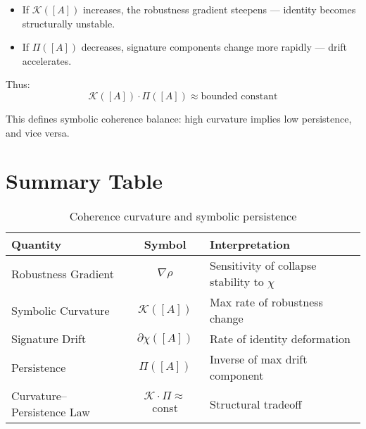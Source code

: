 \begin{itemize}
    \item If $\mathcal{K}([A])$ increases, the robustness gradient steepens — identity becomes structurally unstable.
    \item If $\Pi([A])$ decreases, signature components change more rapidly — drift accelerates.
\end{itemize}

Thus:
\begin{equation} \label{eq:curvature-inverse-persistence}
\mathcal{K}([A]) \cdot \Pi([A]) \approx \text{bounded constant}
\end{equation}

This defines symbolic coherence balance: high curvature implies low persistence, and vice versa.

\section{Summary Table}

\begin{table}[h!]
\centering
\begin{tabular}{|l|c|l|}
\hline
\textbf{Quantity} & \textbf{Symbol} & \textbf{Interpretation} \\
\hline
Robustness Gradient & $\nabla \rho$ & Sensitivity of collapse stability to $\chi$ \\
Symbolic Curvature & $\mathcal{K}([A])$ & Max rate of robustness change \\
Signature Drift & $\partial\chi([A])$ & Rate of identity deformation \\
Persistence & $\Pi([A])$ & Inverse of max drift component \\
Curvature–Persistence Law & $\mathcal{K} \cdot \Pi \approx$ const & Structural tradeoff \\
\hline
\end{tabular}
\caption{Coherence curvature and symbolic persistence}
\end{table}
